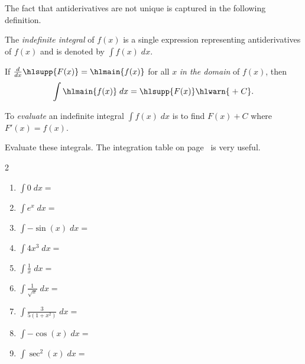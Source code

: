 \documentclass[../main.tex]{subfiles}
\begin{document}
%
The fact that antiderivatives are not unique is captured in the following definition. 

\begin{definition} \label{def:indefinite-integral}
  The \emph{indefinite integral} of \(f(x)\) is a single expression representing  antiderivatives of \(f(x)\) and is denoted by \(\int f(x) \;dx\). 

  If \(\frac{d}{dx}\hlsupp{F(x)} = \hlmain{f(x)}\) for all \(x\) \emph{in the domain} of \(f(x)\), then
  \[
    \int \hlmain{f(x)} \;dx = \hlsupp{F(x)} \hlwarn{\;+\;C}.
  \]

  To \emph{evaluate} an indefinite integral \(\int f(x) \;dx\) is to find \(F(x) + C\) where \(F'(x) = f(x)\).

\end{definition}

\begin{example}
  Evaluate these integrals. The integration table on page~\pageref{sec:integration-formulas} is very useful.

  \begin{multicols}{2}
    \begin{enumerate}[itemsep={2cm}]
      \item \(\int 0 \;dx = \phantom{\text{(any constant)} + C}  \)
      \item \(\int e^{x}\;dx = \phantom{e^{x} + C}\)
      \item \(\int -\sin(x) \;dx = \)
      \item \(\int 4x^{3} \;dx = \)
      \item \(\int \frac{1}{x} \;dx = \phantom{\ln|x| + C}\)
      \item \(\int \frac{1}{\sqrt{x}} \;dx = \)
      \item \(\int \frac{3}{5(1 + x^{2})} \;dx = \)
      \item \(\int -\cos(x) \;dx = \)
      \item \(\int \sec^{2}(x) \;dx = \)
    \end{enumerate}
  \end{multicols}

\end{example}
\clearpage
\end{document}
